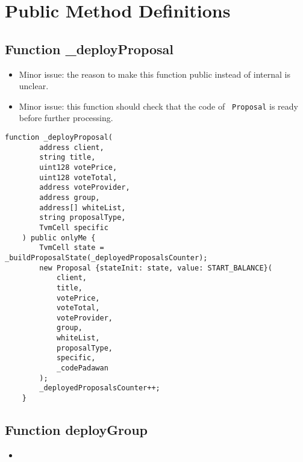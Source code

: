 \section{Public Method Definitions}


\subsection{Function \_{}deployProposal}

\begin{itemize}
\item Minor issue: the reason to make this function public instead of
  internal is unclear.
\item Minor issue: this function should check that the code of {\tt
  Proposal} is ready before further processing.
\end{itemize}

\begin{lstlisting}[firstnumber=194]
    function _deployProposal(
        address client,
        string title,
        uint128 votePrice,
        uint128 voteTotal,
        address voteProvider,
        address group,
        address[] whiteList,
        string proposalType,
        TvmCell specific
    ) public onlyMe {
        TvmCell state = _buildProposalState(_deployedProposalsCounter);
        new Proposal {stateInit: state, value: START_BALANCE}(
            client,
            title,
            votePrice,
            voteTotal,
            voteProvider,
            group,
            whiteList,
            proposalType,
            specific,
            _codePadawan
        );
        _deployedProposalsCounter++;
    }
\end{lstlisting}

\subsection{Function deployGroup}

\begin{itemize}
\item {}
\end{itemize}

